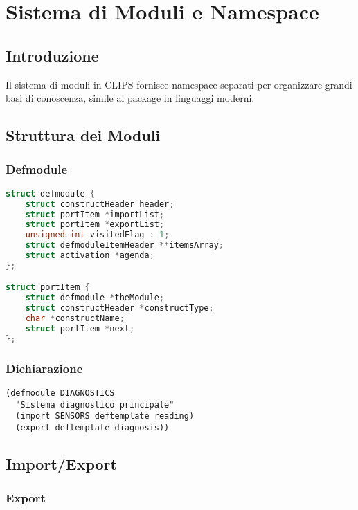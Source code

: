 
\chapter{Sistema di Moduli e Namespace}
\label{cap:clips_moduli}

\section{Introduzione}

Il sistema di moduli in CLIPS fornisce namespace separati per organizzare grandi basi di conoscenza, simile ai package in linguaggi moderni.

\section{Struttura dei Moduli}

\subsection{Defmodule}

\begin{lstlisting}[language=C]
struct defmodule {
    struct constructHeader header;
    struct portItem *importList;
    struct portItem *exportList;
    unsigned int visitedFlag : 1;
    struct defmoduleItemHeader **itemsArray;
    struct activation *agenda;
};

struct portItem {
    struct defmodule *theModule;
    struct constructHeader *constructType;
    char *constructName;
    struct portItem *next;
};
\end{lstlisting}

\subsection{Dichiarazione}

\begin{lstlisting}[language=CLIPS]
(defmodule DIAGNOSTICS
  "Sistema diagnostico principale"
  (import SENSORS deftemplate reading)
  (export deftemplate diagnosis))
\end{lstlisting}

\section{Import/Export}

\subsection{Export}

